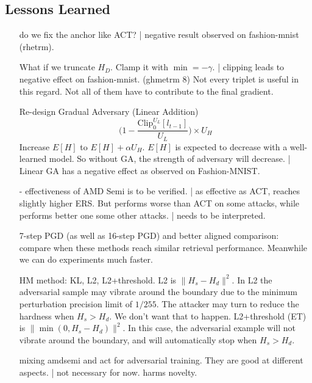 \subsection{Lessons Learned}



\begin{enumerate}

	\item [\xmark] do we fix the anchor like ACT? | negative result observed
		on fashion-mnist (rhetrm).

	\item [\xmark] What if we truncate $H_D$. Clamp it with $\min=-\gamma$.
		| clipping leads to negative effect on fashion-mnist. (ghmetrm 8)
		Not every triplet is useful in this regard. Not all of them have to
		contribute to the final gradient.

	\item [\xmark] Re-design Gradual Adversary (Linear Addition)
		\[
			\big(1-\frac{\text{Clip}_0^{U_L}[l_{t-1}]}{U_L} \big)\times U_H
		\]
		Increase $E[H]$ to $E[H]+\alpha U_H$. $E[H]$ is expected to decrease
		with a well-learned model. So without GA, the strength of adversary
		will decrease. | Linear GA has a negative effect as observed on
		Fashion-MNIST.
	
	\item [-] effectiveness of AMD Semi is to be verified. | as effective
		as ACT, reaches slightly higher ERS. But performs worse than ACT on
		some attacks, while performs better one some other attacks. | needs to
		be interpreted.

	\item [\cmark] 7-step PGD (as well as 16-step PGD) and better aligned comparison:
		compare when these methods reach similar retrieval performance.
		Meanwhile we can do experiments much faster.

	\item [\cmark] HM method: KL, L2, L2+threshold. L2 is $\|H_s-H_d\|^2$.
		In L2 the adversarial sample may vibrate around the boundary due to
		the minimum perturbation precision limit of $1/255$. The attacker
		may turn to reduce the hardness when $H_s>H_d$. We don't want that
		to happen.  L2+threshold (ET) is $\|\min(0,H_s-H_d)\|^2$. In this case,
		the adversarial example will not vibrate around the boundary, and will
		automatically stop when $H_s>H_d$.

	\item [\xmark] mixing amdsemi and act for adversarial training. They are good
		at different aspects. | not necessary for now. harms novelty.


\end{enumerate}
